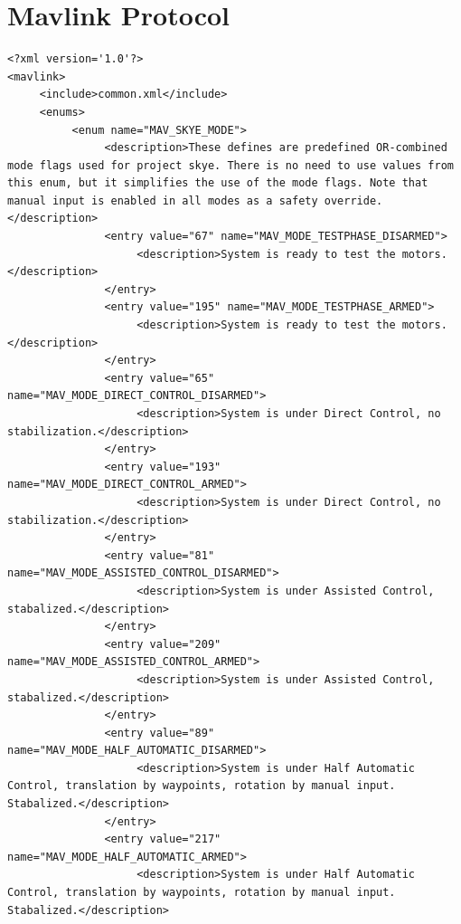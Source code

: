 

\section{Mavlink Protocol}
\label{sec:app_mavlink_protocol}

\begin{lstlisting}[captionpos=b, caption="Definition of \textsc{Skye} specific Mavlink messages", label=app_xml]
<?xml version='1.0'?>
<mavlink>
     <include>common.xml</include>
     <enums>
          <enum name="MAV_SKYE_MODE">
               <description>These defines are predefined OR-combined mode flags used for project skye. There is no need to use values from this enum, but it simplifies the use of the mode flags. Note that manual input is enabled in all modes as a safety override.</description>
               <entry value="67" name="MAV_MODE_TESTPHASE_DISARMED">
                    <description>System is ready to test the motors.</description>
               </entry>
               <entry value="195" name="MAV_MODE_TESTPHASE_ARMED">
                    <description>System is ready to test the motors.</description>
               </entry>
               <entry value="65" name="MAV_MODE_DIRECT_CONTROL_DISARMED">
                    <description>System is under Direct Control, no stabilization.</description>
               </entry>
               <entry value="193" name="MAV_MODE_DIRECT_CONTROL_ARMED">
                    <description>System is under Direct Control, no stabilization.</description>
               </entry>
               <entry value="81" name="MAV_MODE_ASSISTED_CONTROL_DISARMED">
                    <description>System is under Assisted Control, stabalized.</description>
               </entry>
               <entry value="209" name="MAV_MODE_ASSISTED_CONTROL_ARMED">
                    <description>System is under Assisted Control, stabalized.</description>
               </entry>
               <entry value="89" name="MAV_MODE_HALF_AUTOMATIC_DISARMED">
                    <description>System is under Half Automatic Control, translation by waypoints, rotation by manual input. Stabalized.</description>
               </entry>
               <entry value="217" name="MAV_MODE_HALF_AUTOMATIC_ARMED">
                    <description>System is under Half Automatic Control, translation by waypoints, rotation by manual input. Stabalized.</description>

\end{lstlisting}
